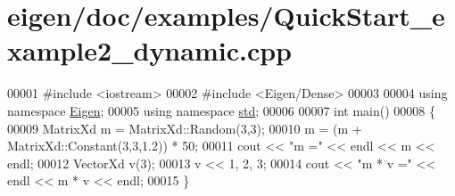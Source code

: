 \hypertarget{eigen_2doc_2examples_2_quick_start__example2__dynamic_8cpp_source}{}\section{eigen/doc/examples/\+Quick\+Start\+\_\+example2\+\_\+dynamic.cpp}
\label{eigen_2doc_2examples_2_quick_start__example2__dynamic_8cpp_source}

\begin{DoxyCode}
00001 \textcolor{preprocessor}{#include <iostream>}
00002 \textcolor{preprocessor}{#include <Eigen/Dense>}
00003 
00004 \textcolor{keyword}{using namespace }\hyperlink{namespace_eigen}{Eigen};
00005 \textcolor{keyword}{using namespace }\hyperlink{namespacestd}{std};
00006 
00007 \textcolor{keywordtype}{int} main()
00008 \{
00009   MatrixXd m = MatrixXd::Random(3,3);
00010   m = (m + MatrixXd::Constant(3,3,1.2)) * 50;
00011   cout << \textcolor{stringliteral}{"m ="} << endl << m << endl;
00012   VectorXd v(3);
00013   v << 1, 2, 3;
00014   cout << \textcolor{stringliteral}{"m * v ="} << endl << m * v << endl;
00015 \}
\end{DoxyCode}

